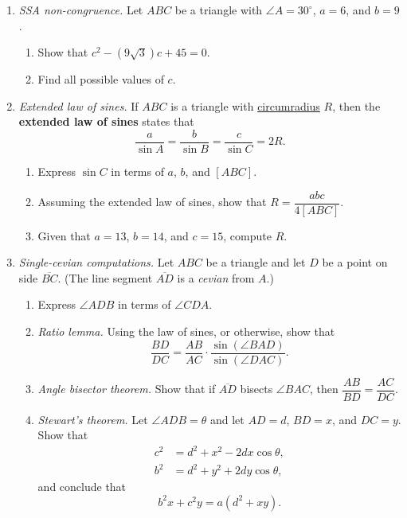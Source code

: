 \begin{enumerate}
\item \emph{SSA non-congruence.} Let $ABC$ be a triangle with $\angle A = 30^{\circ}$, $a = 6$, and $b = 9$.
\begin{enumerate}
\item Show that $c^2 - (9\sqrt{3})c + 45 = 0$.
\item Find all possible values of $c$.
\end{enumerate}
\item \emph{Extended law of sines.} If $ABC$ is a triangle with \href{https://en.wikipedia.org/wiki/Circumcircle}{circumradius} $R$, then the \textbf{extended law of sines} states that
\begin{equation*}
\frac{a}{\sin A} = \frac{b}{\sin B} = \frac{c}{\sin C} = 2R.
\end{equation*}
\begin{enumerate}
\item Express $\sin C$ in terms of $a$, $b$, and $[ABC]$.
\item Assuming the extended law of sines, show that $R = \dfrac{abc}{4[ABC]}$.
\item Given that $a = 13$, $b = 14$, and $c = 15$, compute $R$.
\end{enumerate}
\item \emph{Single-cevian computations.} Let $ABC$ be a triangle and let $D$ be a point on side $\overline{BC}$. (The line segment $\overline{AD}$ is a \emph{cevian} from $A$.)
\begin{enumerate}
\item Express $\angle ADB$ in terms of $\angle CDA$.
\item \emph{Ratio lemma.} Using the law of sines, or otherwise, show that
\begin{equation*}
\frac{BD}{DC} = \frac{AB}{AC}\cdot\frac{\sin(\angle BAD)}{\sin(\angle DAC)}.
\end{equation*}
\item \emph{Angle bisector theorem.} Show that if $\overline{AD}$ bisects $\angle BAC$, then $\dfrac{AB}{BD} = \dfrac{AC}{DC}$.
\item \emph{Stewart's theorem.} Let $\angle ADB = \theta$ and let $AD = d$, $BD = x$, and $DC = y$. Show that
\begin{align*}
c^2 &= d^2 + x^2 - 2dx\cos\theta, \\
b^2 &= d^2 + y^2 + 2dy\cos\theta,
\end{align*}
and conclude that
\begin{equation*}
b^2x + c^2y = a(d^2 + xy).
\end{equation*}

\end{enumerate}
\end{enumerate}
